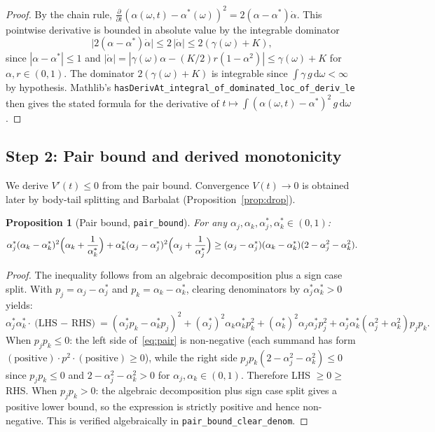\documentclass[11pt,a4paper]{article}
\newtheorem{proposition}[theorem]{Proposition}
\theoremstyle{definition}
\begin{document}
\begin{proof}
By the chain rule, $\frac{\partial}{\partial t}(\alpha(\omega,t) - \alpha^*(\omega))^2 = 2(\alpha - \alpha^*)\dot{\alpha}$. This pointwise derivative is bounded in absolute value by the integrable dominator
\[
\bigl|2(\alpha - \alpha^*)\dot{\alpha}\bigr| \leq 2\,|\dot{\alpha}| \leq 2(\gamma(\omega) + K),
\]
since $|\alpha - \alpha^*| \leq 1$ and $|\dot{\alpha}| = |\gamma(\omega)\alpha - (K/2)r(1-\alpha^2)| \leq \gamma(\omega) + K$ for $\alpha, r \in (0,1)$. The dominator $2(\gamma(\omega) + K)$ is integrable since $\int \gamma\,g\,\mathrm{d}\omega < \infty$ by hypothesis. Mathlib's \texttt{hasDerivAt\_integral\_of\_dominated\_loc\_of\_deriv\_le} then gives the stated formula for the derivative of $t \mapsto \int (\alpha(\omega,t) - \alpha^*)^2\,g\,\mathrm{d}\omega$.
\end{proof}

\subsection{Step 2: Pair bound and derived monotonicity}\label{sec:pair}

We derive $V'(t) \leq 0$ from the pair bound. Convergence $V(t) \to 0$ is obtained later by body-tail splitting and Barbalat (Proposition~\ref{prop:drop}).

\begin{proposition}[Pair bound, \texttt{pair\_bound}]\label{prop:pair}
For any $\alpha_j, \alpha_k, \alpha^*_j, \alpha^*_k \in (0,1)$:
\begin{equation}\label{eq:pair}
\alpha^*_j(\alpha_k - \alpha^*_k)^2\Bigl(\alpha_k + \frac{1}{\alpha^*_k}\Bigr) + \alpha^*_k(\alpha_j - \alpha^*_j)^2\Bigl(\alpha_j + \frac{1}{\alpha^*_j}\Bigr) \geq (\alpha_j - \alpha^*_j)(\alpha_k - \alpha^*_k)(2 - \alpha_j^2 - \alpha_k^2).
\end{equation}
\end{proposition}

\begin{proof}
The inequality follows from an algebraic decomposition plus a sign case split. With $p_j = \alpha_j - \alpha^*_j$ and $p_k = \alpha_k - \alpha^*_k$, clearing denominators by $\alpha^*_j \alpha^*_k > 0$ yields:
\[
\alpha^*_j \alpha^*_k \cdot \text{(LHS $-$ RHS)} = (\alpha^*_j p_k - \alpha^*_k p_j)^2 + (\alpha^*_j)^2 \alpha_k \alpha^*_k p_k^2 + (\alpha^*_k)^2 \alpha_j \alpha^*_j p_j^2 + \alpha^*_j \alpha^*_k (\alpha_j^2 + \alpha_k^2) p_j p_k.
\]
When $p_j p_k \leq 0$: the left side of~\eqref{eq:pair} is non-negative (each summand has form $(\text{positive}) \cdot p^2 \cdot (\text{positive}) \geq 0$), while the right side $p_j p_k(2 - \alpha_j^2 - \alpha_k^2) \leq 0$ since $p_j p_k \leq 0$ and $2 - \alpha_j^2 - \alpha_k^2 > 0$ for $\alpha_j, \alpha_k \in (0,1)$. Therefore LHS $\geq 0 \geq$ RHS. When $p_j p_k > 0$: the algebraic decomposition plus sign case split gives a positive lower bound, so the expression is strictly positive and hence non-negative. This is verified algebraically in \texttt{pair\_bound\_clear\_denom}.
\end{proof}
\end{document}
